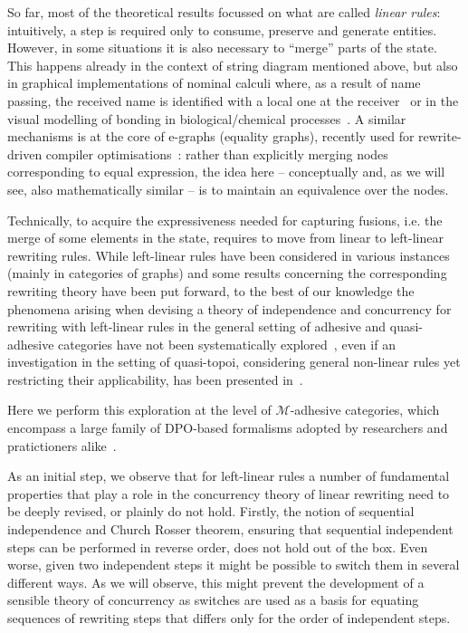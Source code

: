 \documentclass[a4paper,UKenglish,cleveref,pdftex,thm-restate,numberwithinsect,anonymous]{lipics}
\begin{document}
So far, most of the theoretical results focussed on what are called
\emph{linear rules}: intuitively, a step is required only to consume,
preserve and generate entities.  However, in some situations it is
also necessary to ``merge'' parts of the state.  This happens already
in the context of string diagram mentioned above, but also in
graphical implementations of nominal calculi where, as a result of
name passing, the received name is identified with a local one at the
receiver~\cite{CVY:ESSPE,Gad07} or in the visual modelling of bonding
in biological/chemical processes~\cite{PUY:MBPE}. A similar mechanisms
is at the core of e-graphs (equality graphs), recently used for
rewrite-driven compiler optimisations~\cite{WNW:egg}: rather than
explicitly merging nodes corresponding to equal expression, the idea
here -- conceptually and, as we will see, also mathematically similar
-- is to maintain an
equivalence %
over the nodes.



Technically, to acquire the expressiveness needed for capturing
fusions, i.e. the merge of some elements in the state, requires to
move from linear to left-linear rewriting rules. While left-linear
rules have been considered in various instances (mainly in categories
of graphs) and some results concerning the corresponding rewriting
theory have been put forward, to the best of our knowledge the
phenomena arising when devising a theory of independence and
concurrency for rewriting with left-linear rules in the general
setting of adhesive and quasi-adhesive categories
have not been systematically
explored~\cite{Ehrig1976,EHP:BRfTToHLRS,baldan2011adhesivity},
even if an investigation in the setting of quasi-topoi, considering general
non-linear rules yet restricting their applicability,
has been presented in~\cite{BehrHK23}.

Here we perform this exploration at the level of $\mathcal{M}$-adhesive categories, 
which encompass a large family of DPO-based formalisms adopted by researchers and 
pratictioners alike~\cite{xxx}. 

As an initial step, %
we observe that for
left-linear rules a number of fundamental properties that play a role
in the concurrency theory of linear rewriting need to be deeply revised, or
plainly do not hold.
%
Firstly, the notion of sequential independence and Church Rosser
theorem, ensuring that sequential independent steps can be performed
in reverse order, does not hold out of the box. Even worse, given two
independent steps it might be possible to switch them in several
different ways. As we will observe, this might prevent the development
of a sensible theory of concurrency as switches are used as a basis
for equating sequences of rewriting steps that differs only for the order of independent
steps.
\end{document}
